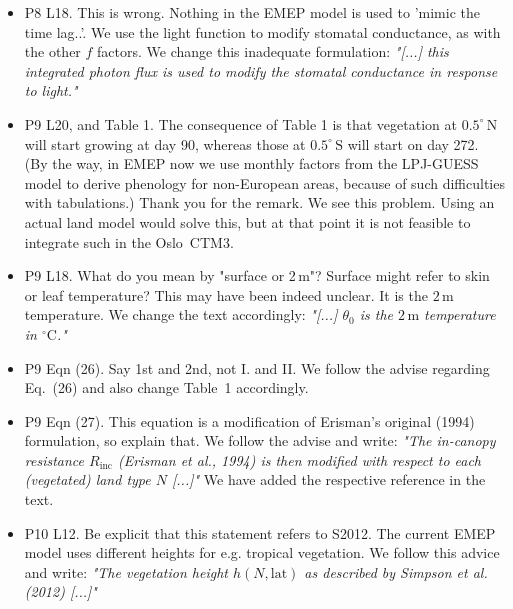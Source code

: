 \begin{itemize}
\item {\color{blue}P8 L18. This is wrong. Nothing in the EMEP model is used to ’mimic the
time lag..’. We use the light function to modify stomatal conductance, as with the
other $f$ factors.}
  We change this inadequate formulation: \emph{"[...] this integrated photon flux is used to modify the stomatal conductance in response to light."}
  
\item {\color{blue}P9 L20, and Table 1. The consequence of Table 1 is that vegetation at $0.5^\circ\,\mathrm{N}$
will start growing at day 90, whereas those at $0.5^\circ\,\mathrm{S}$ will start on day 272. (By the
way, in EMEP now we use monthly factors from the LPJ-GUESS model to derive
phenology for non-European areas, because of such difficulties with tabulations.)}
  Thank you for the remark. We see this problem. Using an actual land model would solve this, but at that point it is not feasible to integrate such in the Oslo~CTM3.
  
\item {\color{blue}P9 L18. What do you mean by "surface or 2\,m"? Surface might refer to skin or leaf temperature?}
  This may have been indeed unclear. It is the $\mathrm{2\,m}$ temperature. We change the text accordingly: \emph{"[...] $\theta_0$ is the $2\,\mathrm{m}$ temperature in $\mathrm{^\circ C}$."}
  
\item {\color{blue}P9 Eqn (26). Say 1st and 2nd, not I. and II.}
  We follow the advise regarding Eq.~(26) and also change Table~1 accordingly.
  
\item {\color{blue}P9 Eqn (27). This equation is a modification of Erisman’s original (1994) formulation, so explain that.}
  We follow the advise and write: \emph{"The in-canopy resistance $R_\text{inc}$ (Erisman et al., 1994) is then modified with respect to each (vegetated) land type $N$ [...]"} {We have added the respective reference in the text.}
  
\item {\color{blue}P10 L12. Be explicit that this statement refers to S2012. The current EMEP
  model uses different heights for e.g. tropical vegetation.}
  We follow this advice and write: \emph{"The vegetation height $h(N, \text{lat})$ as described by Simpson et al. (2012) [...]"}
  

\end{itemize}
